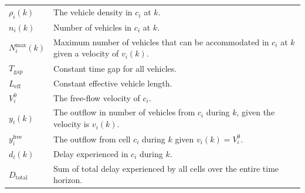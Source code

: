 \documentclass{sig-alternate-05-2015}
\begin{document}
\begin{table}[!h]
{\begin{tabular}{p{1.5cm}p{6cm}}
			$\rho_i(k)$                         & The vehicle density in $c_i$ at  $k$.                                                                                                                                                              \\
		$n_i(k)$                         & Number of vehicles in $c_i$ at $k$.                                                                                                                                                                         \\
		$N_i^{\text{max}}(k)$            & Maximum number of vehicles that can be accommodated in $c_i$ at $k$ given a velocity of $v_i(k)$.                                                              \\
		$T_{\text{gap}}$                 & Constant time gap for all vehicles.                                                                                                                                                                        \\
		$L_{\text{eff}}$                 & Constant effective vehicle length.                                                                                                                                                                                         \\
		$V^0_i$                          & The free-flow velocity of $c_i$.                                                                                                                                                                                    \\
		$y_i(k)$                         & The outflow in number of vehicles from $c_i$ during $k$, given the velocity is $v_i(k)$.                                                           \\
		$y_i^{\text{free}}$              & The outflow from cell $c_i$ during $k$ given $v_i(k)=V^0_i$.                                                                                                                                                               \\
		$d_i(k)$                         & Delay experienced in $c_i$ during $k$.                                                                                                                                                                                     \\
		$D_{\text{total}}$               & Sum of total delay experienced by all cells over the entire time horizon.                                                                                                                                                  \\

\end{tabular}}
\end{table}
\end{document}
